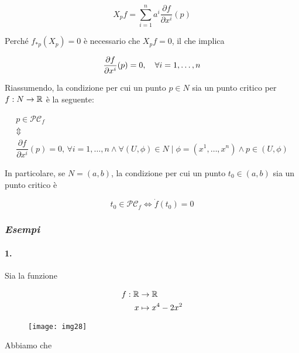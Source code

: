 \begin{equation}
	X_{p} f = \sum_{i=1}^{n} a^{i} \dfrac{\partial f}{\partial x^{i}} (p)
\end{equation}

Perché $ f_{*p}(X_{p}) = 0 $ è necessario che $ X_{p} f = 0 $, il che implica

\begin{equation}
	\dfrac{\partial f}{\partial x^{i}} (p) = 0 \qcomma \forall i=1,\dots,n
\end{equation}

Riassumendo, la condizione per cui un punto $ p \in N $ sia un punto critico per $ f : N \to \mathbb{R} $ è la seguente:

\begin{gather}
	p \in \mathcal{PC}_{f}\nonumber\\
	\Updownarrow\\
	\dfrac{\partial f}{\partial x^{i}} (p) = 0, \, \forall i=1,\dots,n \wedge \forall (U,\phi) \in N \mid \phi = (x^{1},\dots,x^{n}) \wedge p \in (U,\phi)\nonumber
\end{gather}

In particolare, se $ N = (a,b) $, la condizione per cui un punto $ t_{0} \in (a,b) $ sia un punto critico è

\begin{equation}
	t_{0} \in \mathcal{PC}_{f} \iff \dot{f}(t_{0}) = 0
\end{equation}

\subsubsection{\textit{Esempi}}

\paragraph{1.}

Sia la funzione

\begin{align}
	\begin{split}
		f : \mathbb{R} &\to \mathbb{R}\\
		x &\mapsto x^{4} - 2 x^{2}
	\end{split}
\end{align}

\begin{figure}[H]
	\centering
	\texttt{[image: img28]}
\end{figure}

Abbiamo che

